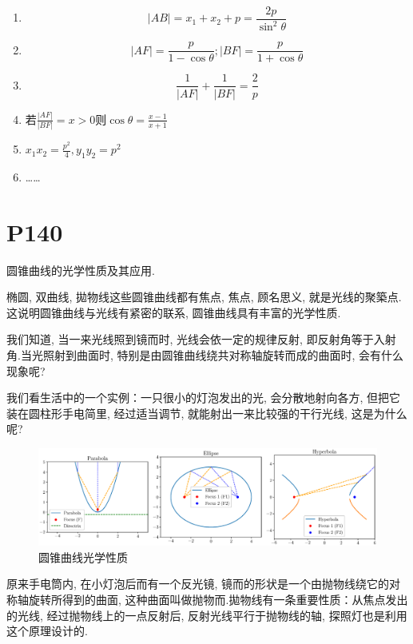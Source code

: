 \documentclass{book}
\begin{document}
    \begin{enumerate}
        \item $$\left| AB \right|=x_1+x_2+p=\frac{2p}{\sin^2\theta}$$
        \item $$\left| AF \right|=\frac{p}{1-\cos \theta};\left| BF \right|=\frac{p}{1+\cos \theta}$$
        \item $$\frac{1}{\left| AF \right|}+\frac{1}{\left| BF \right|}=\frac{2}{p}$$
        \item 若$\displaystyle \frac{\left| AF \right|}{\left| BF \right|}=x>0$则$\displaystyle \cos \theta = \frac{x-1}{x+1}$
        \item $\displaystyle x_1x_2=\frac{p^2}{4},y_1y_2=p^2$
        \item \dots\dots
    \end{enumerate}

    \section{\textcolor[rgb]{0.11,0.65,0.52}{P140}}

    圆锥曲线的光学性质及其应用.

    椭圆, 双曲线, 拋物线这些圆锥曲线都有焦点, 焦点, 顾名思义, 就是光线的聚築点. 这说明圆锥曲线与光线有紧密的联系, 圆锥曲线具有丰富的光学性质.

    我们知道, 当一来光线照到镜而时, 光线会依一定的规律反射, 即反射角等于入射角.当光照射到曲面时, 特别是由圆锥曲线绕共对称轴旋转而成的曲面时, 会有什么现象呢?

    我们看生活中的一个实例：一只很小的灯泡发出的光, 会分散地射向各方, 但把它装在圆柱形手电简里, 经过适当调节, 就能射出一来比较强的干行光线, 这是为什么呢?

    \begin{figure}[htbp]
        \centering
        \includegraphics[width=\textwidth]{img/ConicCurveLightAttribute.eps}
        \caption{圆锥曲线光学性质}
    \end{figure}

    原来手电筒内, 在小灯泡后而有一个反光镜, 镜而的形状是一个由抛物线绕它的对称轴旋转所得到的曲面, 这种曲面叫做抛物而.拋物线有一条重要性质：从焦点发出的光线, 经过抛物线上的一点反射后, 反射光线平行于抛物线的轴, 探照灯也是利用这个原理设计的.
\end{document}
